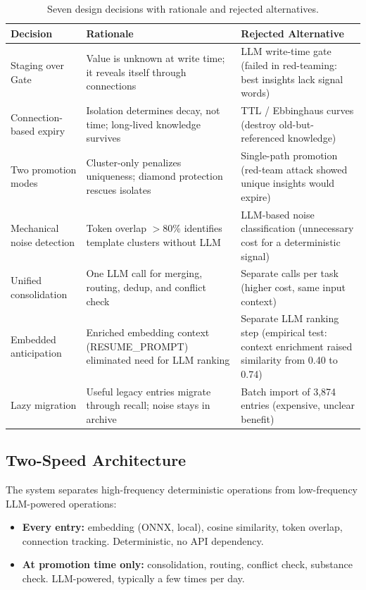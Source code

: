 \documentclass[11pt,a4paper]{article}
\begin{document}
\begin{table}[H]
\centering
\caption{Seven design decisions with rationale and rejected alternatives.}
\label{tab:decisions}
\small
\begin{tabularx}{\textwidth}{lXX}
\toprule
\textbf{Decision} & \textbf{Rationale} & \textbf{Rejected Alternative} \\
\midrule
Staging over Gate & Value is unknown at write time; it reveals itself through connections & LLM write-time gate (failed in red-teaming: best insights lack signal words) \\
\addlinespace
Connection-based expiry & Isolation determines decay, not time; long-lived knowledge survives & TTL / Ebbinghaus curves (destroy old-but-referenced knowledge) \\
\addlinespace
Two promotion modes & Cluster-only penalizes uniqueness; diamond protection rescues isolates & Single-path promotion (red-team attack showed unique insights would expire) \\
\addlinespace
Mechanical noise detection & Token overlap $>$80\% identifies template clusters without LLM & LLM-based noise classification (unnecessary cost for a deterministic signal) \\
\addlinespace
Unified consolidation & One LLM call for merging, routing, dedup, and conflict check & Separate calls per task (higher cost, same input context) \\
\addlinespace
Embedded anticipation & Enriched embedding context (RESUME\_PROMPT) eliminated need for LLM ranking & Separate LLM ranking step (empirical test: context enrichment raised similarity from 0.40 to 0.74) \\
\addlinespace
Lazy migration & Useful legacy entries migrate through recall; noise stays in archive & Batch import of 3,874 entries (expensive, unclear benefit) \\
\bottomrule
\end{tabularx}
\end{table}


\subsection{Two-Speed Architecture}

The system separates high-frequency deterministic operations from low-frequency LLM-powered operations:

\begin{itemize}[nosep]
    \item \textbf{Every entry:} embedding (ONNX, local), cosine similarity, token overlap, connection tracking. Deterministic, no API dependency.
    \item \textbf{At promotion time only:} consolidation, routing, conflict check, substance check. LLM-powered, typically a few times per day.
\end{itemize}
\end{document}
